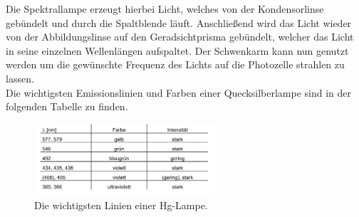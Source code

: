     Die Spektrallampe erzeugt hierbei Licht, welches von der Kondensorlinse gebündelt und durch die Spaltblende läuft.
    Anschließend wird das Licht wieder von der Abbildungslinse auf den Geradsichtprisma gebündelt, welcher das Licht in seine einzelnen Wellenlängen aufspaltet.
    Der Schwenkarm kann nun genutzt werden um die gewünschte Frequenz des Lichts auf die Photozelle strahlen zu lassen.\\
    Die wichtigsten Emissionslinien und Farben einer Quecksilberlampe sind in der folgenden Tabelle zu finden.

    \begin{figure}[H]
        \centering
        \includegraphics[width=0.6\textwidth]{latex/images/Hg.PNG}
        \caption{Die wichtigsten Linien einer Hg-Lampe\protect \cite{500}.}
        \label{img:Hg}
    \end{figure}